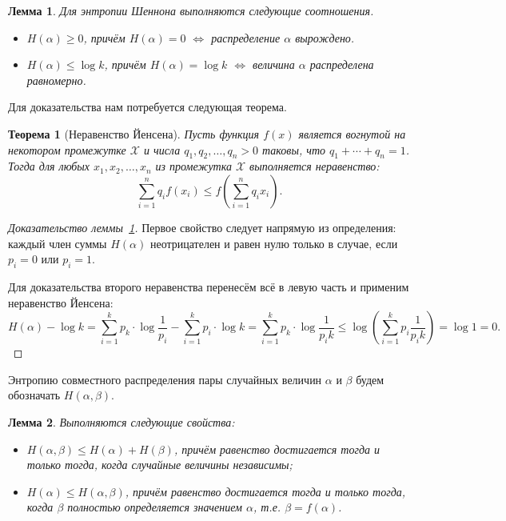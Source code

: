 \documentclass[12pt]{article}
\newcommand{\seqn}[2]{{#1}_1,{#1}_2,\dotsc,{#1}_{#2}}
\theoremstyle{definition}
\theoremstyle{plain}
\newtheorem{theorem}{Теорема}[section]
\newtheorem{lemma}{Лемма}[section]
\theoremstyle{remark}
\begin{document}
\begin{lemma}\label{lm:entropy-properties}
Для энтропии Шеннона выполняются следующие соотношения.
\begin{itemize}
\item \(H(\alpha) \ge 0\), причём \(H(\alpha) = 0\) \(\iff\) распределение \(\alpha\) вырождено.

\item \(H(\alpha) \le \log k\), причём \(H(\alpha) = \log k\) \(\iff\) величина \(\alpha\) распределена равномерно.

\end{itemize}
\end{lemma}

Для доказательства нам потребуется следующая теорема.

\begin{theorem}[Неравенство Йенсена]
Пусть функция \(f ( x ) \) является вогнутой на некотором промежутке \(\mathcal {X}\)
и числа \(\seqn{q}{n}>0\) таковы, что \(q_1+\dotsb +q_{n}=1\). 
Тогда для любых \(\seqn{x}{n}\) из промежутка \(\mathcal X\) выполняется неравенство:
\[
\sum _{{i=1}}^{{n}}q_{i}f(x_{i})\leq f\left(\sum _{{i=1}}^{{n}}q_{i}x_{i}\right). 
\]
\end{theorem}
\begin{proof}[Доказательство леммы~\ref{lm:entropy-properties}]
Первое свойство следует напрямую из определения: каждый член суммы \(H(\alpha)\) неотрицателен и равен нулю только в случае, если \(p_i = 0\) или \(p_i = 1\).

Для доказательства второго неравенства перенесём всё в левую часть и применим неравенство Йенсена:
\[
H(\alpha) - \log k 
= \sum_{i=1}^k p_k\cdot\log\frac{1}{p_i} - \sum_{i=1}^k p_i\cdot\log k 
= \sum_{i=1}^k p_k\cdot\log\frac{1}{p_ik} 
\le \log\left(\sum_{i=1}^k p_i\frac{1}{p_i k}\right) = \log 1 = 0.
\]
\end{proof}
Энтропию совместного распределения пары случайных величин \(\alpha\) и \(\beta\) будем обозначать \(H(\alpha,\beta)\).
\begin{lemma}
Выполняются следующие свойства:
\begin{itemize}
    \item \(H(\alpha, \beta) \le H(\alpha) + H(\beta)\), причём равенство достигается тогда и только тогда, когда случайные величины независимы;
    \item \(H(\alpha) \le H(\alpha, \beta)\), причём равенство достигается тогда и только тогда, когда \(\beta\) полностью определяется значением \(\alpha\), 
    т.е. \(\beta = f(\alpha)\).
\end{itemize}
\end{lemma}
\end{document}
